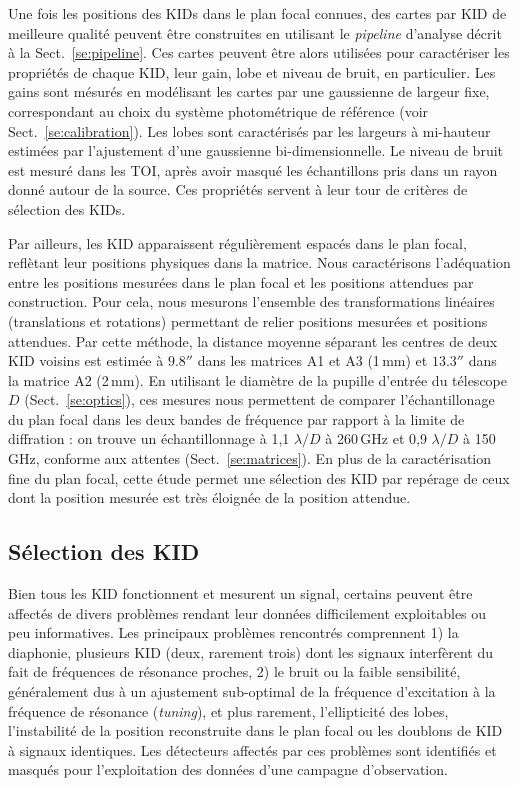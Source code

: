 Une fois les positions des KIDs dans le plan focal connues, des cartes
par KID de meilleure qualité peuvent être construites en utilisant le
\emph{pipeline} d'analyse décrit à la Sect.~\ref{se:pipeline}. Ces
cartes peuvent être alors utilisées pour caractériser les propriétés
de chaque KID, leur gain, lobe et niveau de bruit, en particulier. Les
gains sont mésurés en modélisant les cartes par une gaussienne de
largeur fixe, correspondant au choix du système photométrique de
référence (voir Sect.~\ref{se:calibration}). Les lobes sont
caractérisés par les largeurs à mi-hauteur estimées par l'ajustement
d'une gaussienne bi-dimensionnelle. Le niveau de bruit est mesuré dans
les TOI, après avoir masqué les échantillons pris dans un rayon donné
autour de la source. Ces propriétés servent à leur tour de critères de
sélection des KIDs.

Par ailleurs, les KID apparaissent régulièrement espacés dans le plan
focal, reflètant leur positions physiques dans la matrice. Nous
caractérisons l'adéquation entre les positions mesurées dans le plan
focal et les positions attendues par construction. Pour cela, nous
mesurons l'ensemble des transformations linéaires (translations et
rotations) permettant de relier positions mesurées et positions
attendues. Par cette méthode, la distance moyenne séparant les centres
de deux KID voisins est estimée à $9.8''$ dans les matrices A1 et A3
(1\,mm) et $13.3''$ dans la matrice A2 (2\,mm). En utilisant le
diamètre de la pupille d'entrée du télescope $D$ (Sect.~\ref{se:optics}),
ces mesures nous permettent de comparer l'échantillonage du plan focal
dans les deux bandes de fréquence par rapport à la limite de
diffration : on trouve un échantillonnage à 1,1 $\lambda/D$ à
260\,GHz et 0,9 $\lambda/D$ à 150\,GHz, conforme aux attentes
(Sect.~\ref{se:matrices}). En plus de la caractérisation fine du plan
focal, cette étude permet une sélection des KID par repérage de ceux
dont la position mesurée est très éloignée de la position attendue.   


\subsection{Sélection des KID}

Bien tous les KID fonctionnent et mesurent un signal, certains peuvent
être affectés de divers problèmes rendant leur données difficilement
exploitables ou peu informatives. Les principaux problèmes rencontrés
comprennent 1) la diaphonie, plusieurs KID (deux, rarement trois) dont
les signaux interfèrent du fait de fréquences de résonance proches, 2)
le bruit ou la faible sensibilité, généralement dus à un ajustement
sub-optimal de la fréquence d'excitation à la fréquence de résonance
(\emph{tuning}), et plus rarement, l'ellipticité des lobes,
l'instabilité de la position reconstruite dans le plan focal ou les
doublons de KID à signaux identiques. Les détecteurs affectés par ces
problèmes sont identifiés et masqués pour l'exploitation des données
d'une campagne d'observation.

